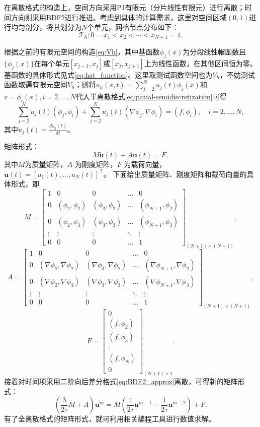 \documentclass{GZUbachelorthesis}
\theoremstyle{chineseplain}
\begin{document}
在离散格式的构造上，空间方向采用P1有限元（分片线性有限元）进行离散；时间方向则采用BDF2进行推进。考虑到具体的计算需求，这里对空间区域$(0,1)$进行均匀剖分，将其划分为$N$个单元，网格节点分布如下：
\[
\mathcal{T}_h: 0 = x_1 < x_2 < \cdots < x_{N+1} = 1.
\]

根据之前的有限元空间的构造\eqref{eq:Vh}，其中基函数$\phi_j(x)$为分段线性帽函数且$\{ \phi_j(x) \}$在每个单元$[x_{j-1}, x_j]$或$[x_j, x_{j+1}]$上为线性函数，在其他区间恒为零。基函数的具体形式见式\eqref{eq:hat_function}。这里取测试函数空间也为$V_h$，不妨测试函数取遍有限元空间$V_h$；则将$u_h(x,t) = \sum_{j=2}^{N} u_j(t) \phi_j(x)$和$v=\phi_i(x),i = 2, \dots, N$代入半离散格式\eqref{eq:patial-semidiscretization}可得
\begin{equation}
\sum_{j=2}^N \dot{u}_j(t)(\phi_j, \phi_i) + \sum_{j=2}^N u_j(t)(\nabla \phi_j, \nabla \phi_i) = (f, \phi_i), \quad i = 2, \dots, N,
\end{equation}
其中$\dot{u}_j(t)=\frac{d{u}_j(t)}{dt}$。

矩阵形式：
\begin{equation}
	\label{eq:matrix-form}
M\dot{\mathbf{u}}(t) + A\mathbf{u}(t) = F,
\end{equation}
其中$M$为质量矩阵，$A$ 为刚度矩阵，$F$ 为载荷向量，$\mathbf{u}(t) = [u_1(t), \dots, u_N(t)]^\top$。
下面给出质量矩阵、刚度矩阵和载荷向量的具体形式，即
\[
M=
\begin{bmatrix}
	1 & 0 & 0 & \dots & 0 \\
	0 & (\phi_2, \phi_2) & (\phi_3, \phi_2) & \dots & (\phi_{N+1}, \phi_2) \\
0 & (\phi_2, \phi_3) & (\phi_3, \phi_3) & \dots & (\phi_{N+1}, \phi_3) \\
	\vdots & \vdots & \vdots & \ddots & \vdots \\
	0 & 0 & 0 & \dots & 1
\end{bmatrix}_{(N+1)\times(N+1)},
\]
\[
A=
\begin{bmatrix}
	1 & 0 & 0 & \dots & 0 \\
	0 & (\nabla\phi_2,\nabla\phi_2) & (\nabla\phi_3,\nabla\phi_2) & \dots & (\nabla\phi_{N+1},\nabla\phi_2) \\
0 & (\nabla\phi_2,\nabla\phi_3) & (\nabla\phi_3,\nabla\phi_3) & \dots & (\nabla\phi_{N+1},\nabla\phi_3) \\
	\vdots & \vdots & \vdots & \ddots & \vdots \\
	0 & 0 & 0 & \dots & 1
\end{bmatrix}_{(N+1)\times(N+1)},
\]
\[
F=
\begin{bmatrix}
	0 \\
	(f,\phi_2) \\
	(f,\phi_3) \\
	\vdots \\
	(f,\phi_N) \\
	0
\end{bmatrix}_{(N+1)\times 1}.
\]
接着对时间项采用二阶向后差分格式\eqref{eq:BDF2_approx}离散，可得新的矩阵形式：
\begin{equation}
\left( \frac{3}{2\tau} M + A\right) \mathbf{u}^m 
= M \left( \frac{4}{2\tau} \mathbf{u}^{m-1} - \frac{1}{2\tau} \mathbf{u}^{m-2} \right) + F.
\end{equation}
有了全离散格式的矩阵形式，就可利用相关编程工具进行数值求解。
\end{document}
